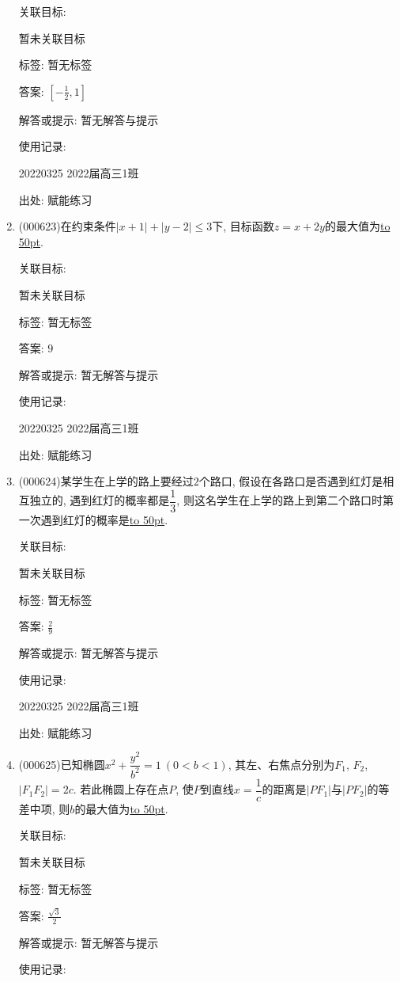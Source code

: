 \documentclass[10pt,a4paper]{article}
\newcommand{\blank}[1]{\underline{\hbox to #1pt{}}}
\begin{document}
\begin{enumerate}[1.]
关联目标:

暂未关联目标



标签: 暂无标签

答案: $[-\frac 12,1]$

解答或提示: 暂无解答与提示

使用记录:

20220325	2022届高三1班	


出处: 赋能练习
\item { (000623)}在约束条件$|x+1|+|y-2|\le 3$下, 目标函数$z=x+2y$的最大值为\blank{50}.


关联目标:

暂未关联目标



标签: 暂无标签

答案: $9$

解答或提示: 暂无解答与提示

使用记录:

20220325	2022届高三1班	


出处: 赋能练习
\item { (000624)}某学生在上学的路上要经过$2$个路口, 假设在各路口是否遇到红灯是相互独立的, 遇到红灯的概率都是$\dfrac13$, 则这名学生在上学的路上到第二个路口时第一次遇到红灯的概率是\blank{50}.


关联目标:

暂未关联目标



标签: 暂无标签

答案: $\frac 29$

解答或提示: 暂无解答与提示

使用记录:

20220325	2022届高三1班	


出处: 赋能练习
\item { (000625)}已知椭圆$x^2+\dfrac{y^2}{b^2}=1\ (0<b<1)$, 其左、右焦点分别为$F_1$, $F_2$, $|F_1F_2|=2c$. 若此椭圆上存在点$P$, 使$P$到直线$x=\dfrac1c$的距离是$|PF_1|$与$|PF_2|$的等差中项, 则$b$的最大值为\blank{50}.


关联目标:

暂未关联目标



标签: 暂无标签

答案: $\frac{\sqrt 3}2$

解答或提示: 暂无解答与提示

使用记录:


\end{enumerate}
\end{document}
